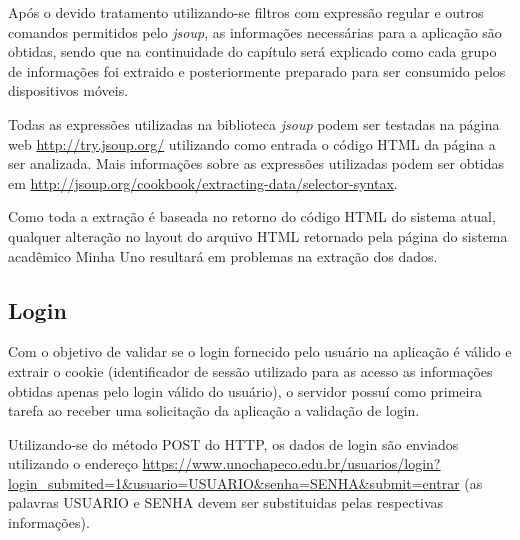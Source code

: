 Após o devido tratamento utilizando-se filtros com expressão regular e outros comandos permitidos pelo \emph{jsoup}, as informações necessárias para a aplicação são obtidas, sendo que na continuidade do capítulo será explicado como cada grupo de informações foi extraido e posteriormente preparado para ser consumido pelos dispositivos móveis.

Todas as expressões utilizadas na biblioteca \emph{jsoup} podem ser testadas na página web \url{http://try.jsoup.org/} utilizando como entrada o código HTML da página a ser analizada. Mais informações sobre as expressões utilizadas podem ser obtidas em \url{http://jsoup.org/cookbook/extracting-data/selector-syntax}.

Como toda a extração é baseada no retorno do código HTML do sistema atual, qualquer alteração no layout do arquivo HTML retornado pela página do sistema acadêmico Minha Uno resultará em problemas na extração dos dados.


\subsection{Login}
Com o objetivo de validar se o login fornecido pelo usuário na aplicação é válido e extrair o cookie (identificador de sessão utilizado para as acesso as informações obtidas apenas pelo login válido do usuário), o servidor possuí como primeira tarefa ao receber uma solicitação da aplicação a validação de login.

Utilizando-se do método POST do HTTP, os dados de login são enviados utilizando o endereço \url{https://www.unochapeco.edu.br/usuarios/login?login_submited=1&usuario=USUARIO&senha=SENHA&submit=entrar} (as palavras USUARIO e SENHA devem ser substituidas pelas respectivas informações).


 
 


